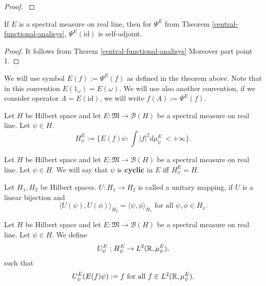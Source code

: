 \documentclass[main.tex]{subfiles}
\begin{document}
\begin{proof}
\cite[see][Unbounded Operators on a Hilbert Space, Resolution of Identity]{rudin1991}
\end{proof}
\begin{corollary}
\label{self-adjoint-corollary}
If $E$ is a spectral measure on real line, then for $\Psi^E$ from Theorem \ref{central-functional-analisys}, $\Psi^E(\text{id})$ is self-adjoint.
\end{corollary}
\begin{proof}
It follows from Therem \ref{central-functional-analisys} Moreover part point 1.
\end{proof}
We will use symbol $E(f):=\Psi^E(f)$ as defined in the theorem above. Note that in this convention $E(1_\omega) = E(\omega)$. We will use also another convention, if we consider operator $A = E(\text{id})$, we will write $f(A):=\Psi^E(f)$.
\begin{definition}
Let $H$ be Hilbert space and let $E:\mathfrak{M}\to \mathcal{B}(H)$ be a spectral measure on real line. Let $\psi\in H$.
\begin{equation}
H^E_\psi := \{E(f)\psi : \int |f|^2 d\mu^E_\psi\ < +\infty\}.
\end{equation}
\end{definition}
\begin{definition}
Let $H$ be Hilbert space and let $E:\mathfrak{M}\to \mathcal{B}(H)$ be a spectral measure on real line. Let $\psi\in H$.
We will say that $\psi$ is \textbf{cyclic} in $E$ iff $H^E_\psi = H$.
\end{definition}
\begin{definition}
Let $H_1, H_2$ be Hilbert spaces. $U:H_1\to H_2$ is called a unitary mapping, if $U$ is a linear bijection and
\begin{equation}
\langle U(\psi), U(\phi) \rangle_{H_2} = \langle \psi, \phi \rangle_{H_1} \text{ for all } \psi,\phi\in H_1. 
\end{equation}
\end{definition}
\begin{definition}
Let $H$ be Hilbert space and let $E:\mathfrak{M}\to \mathcal{B}(H)$ be a spectral measure on real line. Let $\psi\in H$.
We define
\begin{equation}
U^E_\psi:H_\psi^E\to L^2(\mathbb{R}, \mu^E_\psi),
\end{equation}
such that
\begin{equation}
U^E_\psi(E(f)\psi) := f \text{ for all } f\in L^2(\mathbb{R}, \mu^E_\psi).
\end{equation}
\end{definition}
\end{document}
